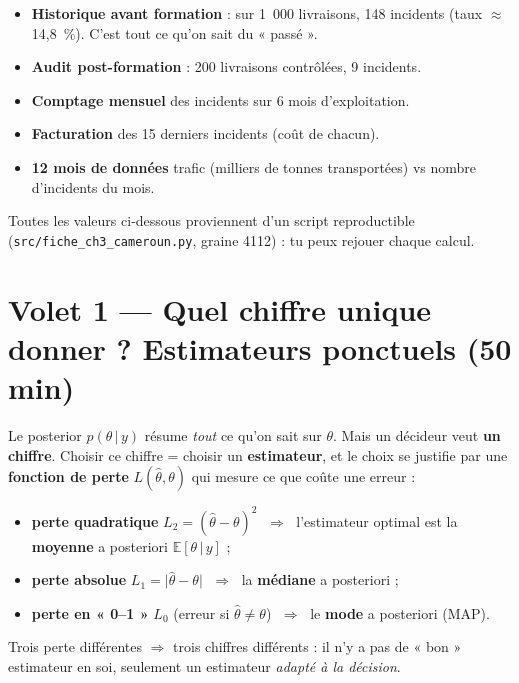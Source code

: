 \documentclass[11pt,a4paper]{article}
\newcommand{\given}{\,\vert\,}
\begin{document}
\begin{application}
\begin{itemize}[leftmargin=4mm, itemsep=0.5mm]
  \item \textbf{Historique avant formation} : sur 1~000 livraisons, 148 incidents
        (taux $\approx$ 14,8~\%). C'est tout ce qu'on sait du « passé ».
  \item \textbf{Audit post-formation} : 200 livraisons contrôlées, 9 incidents.
  \item \textbf{Comptage mensuel} des incidents sur 6 mois d'exploitation.
  \item \textbf{Facturation} des 15 derniers incidents (coût de chacun).
  \item \textbf{12 mois de données} trafic (milliers de tonnes transportées) vs
        nombre d'incidents du mois.
\end{itemize}
Toutes les valeurs ci-dessous proviennent d'un script reproductible
(\texttt{src/fiche\_ch3\_cameroun.py}, graine 4112) : tu peux rejouer chaque calcul.
\end{application}

\section{Volet 1 --- Quel chiffre unique donner ? Estimateurs ponctuels (50 min)}

\begin{rappel}
Le posterior $p(\theta \given y)$ résume \emph{tout} ce qu'on sait sur $\theta$.
Mais un décideur veut \textbf{un chiffre}. Choisir ce chiffre = choisir un
\textbf{estimateur}, et le choix se justifie par une \textbf{fonction de perte}
$L(\hat\theta, \theta)$ qui mesure ce que coûte une erreur :
\begin{itemize}[leftmargin=4mm, itemsep=0.5mm]
  \item \textbf{perte quadratique} $L_2 = (\hat\theta - \theta)^2$
        $\;\Rightarrow\;$ l'estimateur optimal est la \textbf{moyenne} a posteriori
        $\mathbb{E}[\theta \given y]$ ;
  \item \textbf{perte absolue} $L_1 = \lvert \hat\theta - \theta \rvert$
        $\;\Rightarrow\;$ la \textbf{médiane} a posteriori ;
  \item \textbf{perte en « 0--1 »} $L_0$ (erreur si $\hat\theta \ne \theta$)
        $\;\Rightarrow\;$ le \textbf{mode} a posteriori (MAP).
\end{itemize}
Trois perte différentes $\Rightarrow$ trois chiffres différents : il n'y a pas
de « bon » estimateur en soi, seulement un estimateur \emph{adapté à la décision}.
\end{rappel}
\end{document}
